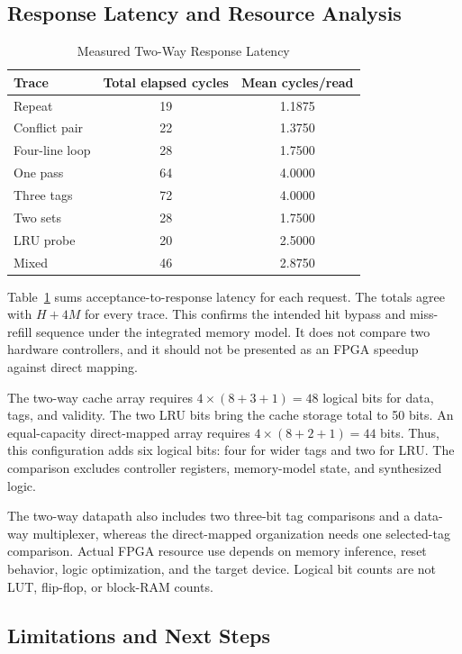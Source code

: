 \documentclass[conference]{IEEEtran}
\begin{document}
\subsection{Response Latency and Resource Analysis}

\begin{table}[!t]
\caption{Measured Two-Way Response Latency}
\label{tab:latency}
\centering
\begin{tabular}{lcc}
\toprule
Trace & Total elapsed cycles & Mean cycles/read \\
\midrule
Repeat & 19 & 1.1875 \\
Conflict pair & 22 & 1.3750 \\
Four-line loop & 28 & 1.7500 \\
One pass & 64 & 4.0000 \\
Three tags & 72 & 4.0000 \\
Two sets & 28 & 1.7500 \\
LRU probe & 20 & 2.5000 \\
Mixed & 46 & 2.8750 \\
\bottomrule
\end{tabular}
\end{table}

Table~\ref{tab:latency} sums acceptance-to-response latency for each
request. The totals agree with $H + 4M$ for every trace. This confirms
the intended hit bypass and miss-refill sequence under the integrated
memory model. It does not compare two hardware controllers, and it
should not be presented as an FPGA speedup against direct mapping.

The two-way cache array requires $4 \times (8 + 3 + 1) = 48$ logical
bits for data, tags, and validity. The two LRU bits bring the cache
storage total to 50 bits. An equal-capacity direct-mapped array requires
$4 \times (8 + 2 + 1) = 44$ bits. Thus, this configuration adds six
logical bits: four for wider tags and two for LRU. The comparison
excludes controller registers, memory-model state, and synthesized
logic.

The two-way datapath also includes two three-bit tag comparisons and a
data-way multiplexer, whereas the direct-mapped organization needs one
selected-tag comparison. Actual FPGA resource use depends on memory
inference, reset behavior, logic optimization, and the target device.
Logical bit counts are not LUT, flip-flop, or block-RAM counts.

\subsection{Limitations and Next Steps}
\end{document}
